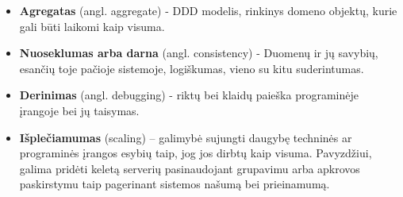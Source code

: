 \begin{itemize}

  \item \textbf{Agregatas} (angl. aggregate) - DDD modelis, rinkinys domeno objektų, kurie gali būti laikomi kaip visuma.

  \item \textbf{Nuoseklumas arba darna} (angl. consistency) - Duomenų ir jų savybių, esančių toje pačioje sistemoje, logiškumas, vieno su kitu suderintumas.

  \item \textbf{Derinimas} (angl. debugging) - riktų bei klaidų paieška programinėje įrangoje bei jų taisymas.

  \item \textbf{Išplečiamumas} (scaling) – galimybė sujungti daugybę techninės ar programinės įrangos esybių taip, jog jos dirbtų kaip visuma. Pavyzdžiui, galima pridėti keletą serverių pasinaudojant grupavimu arba apkrovos paskirstymu taip pagerinant sistemos našumą bei prieinamumą.

\end{itemize}
